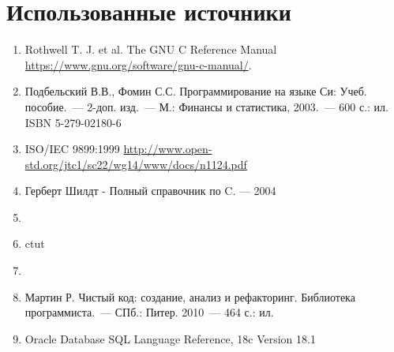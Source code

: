 \documentclass[myc.tex]{subfiles}
\begin{document}
\chapter*{Использованные источники}
\begin{enumerate}
\item Rothwell T. J. et al. The GNU C Reference Manual \url{https://www.gnu.org/software/gnu-c-manual/}.%
\item Подбельский В.В., Фомин С.С. Программирование на языке Си: Учеб. пособие.~--- 2-доп. изд.~--- М.: Финансы и статистика, 2003.~--- 600 с.: ил. ISBN 5-279-02180-6
\item ISO/IEC 9899:1999 \url{http://www.open-std.org/jtc1/sc22/wg14/www/docs/n1124.pdf}
\item Герберт Шилдт - Полный справочник по C. --- 2004
\item
\item ctut
\item
\item Мартин Р. Чистый код: создание, анализ и рефакторинг. Библиотека программиста.~--- СПб.: Питер. 2010~--- 464 с.: ил.
\item Oracle Database SQL Language Reference, 18c Version 18.1
\end{enumerate}
\end{document}
